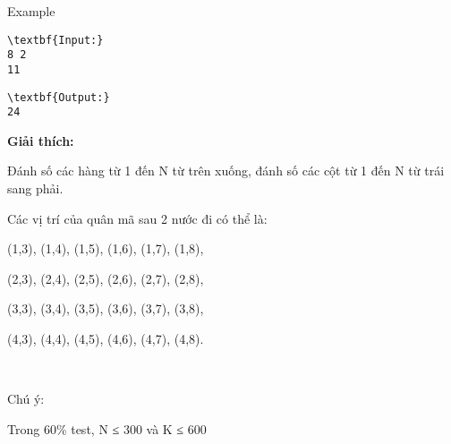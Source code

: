 Example
\begin{verbatim}
\textbf{Input:}
8 2
11\end{verbatim}
\begin{verbatim}
\textbf{Output:}
24\end{verbatim}




\textbf{​Giải thích:}

Đánh số các hàng từ 1 đến N từ trên xuống, đánh số các cột từ 1 đến N từ trái sang phải.

Các vị trí của quân mã sau 2 nước đi có thể là:

(1,3), (1,4), (1,5), (1,6), (1,7), (1,8),

(2,3), (2,4), (2,5), (2,6), (2,7), (2,8),

(3,3), (3,4), (3,5), (3,6), (3,7), (3,8),

(4,3), (4,4), (4,5), (4,6), (4,7), (4,8).

 

Chú ý:

Trong 60\% test, N ≤ 300 và K ≤ 600